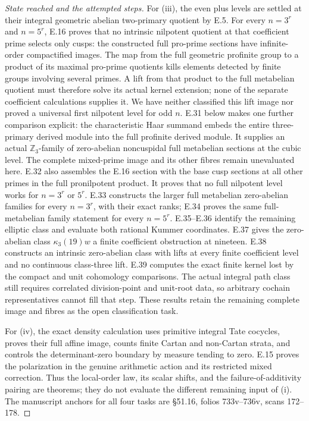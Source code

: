 \documentclass[11pt,oneside]{article}
\begin{document}
\begin{proof}[State reached and the attempted steps]
For (iii), the even plus levels are settled
at their integral geometric abelian
two-primary quotient by E.5. For every
$n=3^r$ and $n=5^r$, E.16 proves that no
intrinsic nilpotent quotient at that
coefficient prime selects only cusps:
the constructed full pro-prime sections
have infinite-order compactified images.
The map from the full geometric profinite
group to a product of its maximal pro-prime
quotients kills elements detected by finite
groups involving several primes. A lift
from that product to the full metabelian
quotient must therefore solve its actual
kernel extension; none of the separate
coefficient calculations supplies it.
We have neither classified this lift
image nor proved a universal first
nilpotent level for odd $n$.
E.31 below makes one further comparison explicit:
the characteristic Haar summand embeds the entire
three-primary derived module into the full
profinite derived module. It supplies an actual
$\mathbb Z_3$-family of zero-abelian noncuspidal
full metabelian sections at the cubic level.
The complete mixed-prime image and its other
fibres remain unevaluated here.
E.32 also assembles the E.16 section with
the base cusp sections at all other primes
in the full pronilpotent product. It proves
that no full nilpotent level works for
$n=3^r$ or $5^r$. E.33 constructs the larger
full metabelian zero-abelian families for
every $n=3^r$, with their exact ranks;
E.34 proves the same full-metabelian family
statement for every $n=5^r$. E.35--E.36
identify the remaining elliptic class and
evaluate both rational Kummer coordinates.
E.37 gives the zero-abelian class
$\kappa_3(19)w$ a finite coefficient
obstruction at nineteen. E.38 constructs an
intrinsic zero-abelian class with lifts at
every finite coefficient level and no
continuous class-three lift. E.39 computes
the exact finite kernel lost by the compact
and unit cohomology comparisons. The actual
integral path class still requires correlated
division-point and unit-root data, so arbitrary
cochain representatives cannot fill that step.
These results retain the remaining complete image and
fibres as the open classification task.

For (iv), the exact density calculation
uses primitive integral Tate cocycles,
proves their full affine image, counts
finite Cartan and non-Cartan strata,
and controls the determinant-zero
boundary by measure tending to zero.
E.15 proves the polarization in the
genuine arithmetic action and its
restricted mixed correction. Thus the
local-order law, its scalar shifts,
and the failure-of-additivity pairing
are theorems; they do not evaluate
the different remaining input of (i).
The manuscript anchors for all four
tasks are \S51.16, folios 733v--736v,
scans 172--178.
\end{proof}
\end{document}
